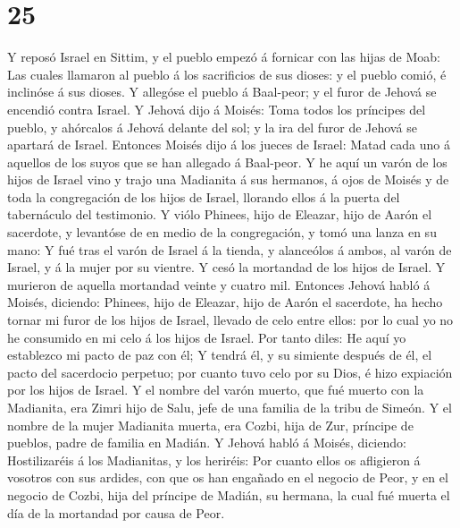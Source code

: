 \hypertarget{section-24}{%
\section{25}\label{section-24}}

 Y reposó Israel en Sittim, y el pueblo empezó á fornicar
con las hijas de Moab:  Las cuales llamaron al pueblo á los
sacrificios de sus dioses: y el pueblo comió, é inclinóse á sus dioses.
 Y allegóse el pueblo á Baal-peor; y el furor de Jehová se
encendió contra Israel.  Y Jehová dijo á Moisés: Toma todos
los príncipes del pueblo, y ahórcalos á Jehová delante del sol; y la ira
del furor de Jehová se apartará de Israel.  Entonces Moisés
dijo á los jueces de Israel: Matad cada uno á aquellos de los suyos que
se han allegado á Baal-peor.  Y he aquí un varón de los
hijos de Israel vino y trajo una Madianita á sus hermanos, á ojos de
Moisés y de toda la congregación de los hijos de Israel, llorando ellos
á la puerta del tabernáculo del testimonio.  Y viólo
Phinees, hijo de Eleazar, hijo de Aarón el sacerdote, y levantóse de en
medio de la congregación, y tomó una lanza en su mano:  Y
fué tras el varón de Israel á la tienda, y alanceólos á ambos, al varón
de Israel, y á la mujer por su vientre. Y cesó la mortandad de los hijos
de Israel.  Y murieron de aquella mortandad veinte y cuatro
mil.  Entonces Jehová habló á Moisés, diciendo:
 Phinees, hijo de Eleazar, hijo de Aarón el sacerdote, ha
hecho tornar mi furor de los hijos de Israel, llevado de celo entre
ellos: por lo cual yo no he consumido en mi celo á los hijos de Israel.
 Por tanto diles: He aquí yo establezco mi pacto de paz con
él;  Y tendrá él, y su simiente después de él, el pacto del
sacerdocio perpetuo; por cuanto tuvo celo por su Dios, é hizo expiación
por los hijos de Israel.  Y el nombre del varón muerto, que
fué muerto con la Madianita, era Zimri hijo de Salu, jefe de una familia
de la tribu de Simeón.  Y el nombre de la mujer Madianita
muerta, era Cozbi, hija de Zur, príncipe de pueblos, padre de familia en
Madián.  Y Jehová habló á Moisés, diciendo: 
Hostilizaréis á los Madianitas, y los heriréis:  Por cuanto
ellos os afligieron á vosotros con sus ardides, con que os han engañado
en el negocio de Peor, y en el negocio de Cozbi, hija del príncipe de
Madián, su hermana, la cual fué muerta el día de la mortandad por causa
de Peor.

